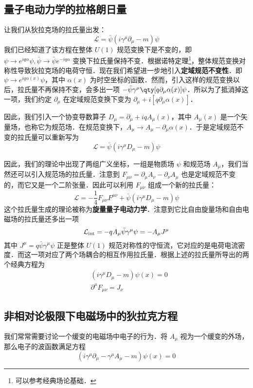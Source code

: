 

\subsection{量子电动力学的拉格朗日量}
让我们从狄拉克场的拉氏量出发：
\begin{equation}
\mathcal{L}=\bar\psi (i\gamma^\mu \partial_\mu - m)\psi 
\end{equation}
我们已经知道了该方程在整体 $U(1)$ 规范变换下是不变的，即 $\psi\rightarrow e^{iq\alpha}\psi,\bar\psi \rightarrow \bar\psi e^{-iq\alpha}$ 变换下拉氏量保持不变．根据诺特定理\footnote{可以参考经典场论基础．}，整体规范变换对称性导致狄拉克场的电荷守恒．现在我们希望进一步地引入\textbf{定域规范不变性}．即 $\psi\rightarrow e^{iq\alpha(x)}\psi $，其中 $\alpha(x)$ 为时空坐标的函数．然而，引入这样的规范变换以后，拉氏量不再保持不变，会多出一项 $-\bar\psi \gamma^\mu \qty[q\partial_\mu \alpha(x)]\psi$．所以为了抵消掉这一项，我们约定 $\partial_\mu$ 在定域规范变换下变为 $\partial_\mu+i[q\partial_\mu \alpha(x)]$．

因此，我们引入一个协变导数算子 $D_\mu = \partial_\mu +iqA_\mu(x)$，其中 $A_\mu(x)$ 是一个矢量场，也称它为规范场．在规范变换下，$A_\mu\rightarrow A_\mu - \partial_\mu \alpha(x)$．于是定域规范不变的拉氏量可以重新写为
\begin{equation}
\mathcal{L}=\bar\psi(i\gamma^\mu D_\mu-m)\psi 
\end{equation}

因此，我们的理论中出现了两组广义坐标，一组是物质场 $\psi$ 和规范场 $A_\mu$，我们当然还可以引入规范场的拉氏量．注意到 $F_{\mu\nu} = \partial_\mu A_\nu - \partial_\nu A_\mu$ 也是定域规范不变的，而它又是一个二阶张量．因此可以利用 $F_{\mu\nu}$ 组成一个新的拉氏量：
\begin{equation}
\mathcal{L}=-\frac{1}{4}F_{\mu\nu}F^{\mu\nu} + \bar\psi (i\gamma^\mu D_\mu - m)\psi
\end{equation}
这个拉氏量生成的理论被称为\textbf{旋量量子电动力学}．注意到它比自由旋量场和自由电磁场的拉氏量还多出一项
\begin{equation}
\mathcal{L}_{\rm int}=-q A_\mu \bar\psi \gamma^\mu \psi=-A_\mu J^\mu
\end{equation}
其中 $J^\mu = q\bar\psi \gamma^\mu \psi$ 正是整体 $U(1)$ 规范对称性的守恒流，它对应的是电荷电流密度．而这一项对应了两个场耦合的相互作用拉氏量．根据上述的拉氏量所导出的两个经典方程为
\begin{equation}
\begin{aligned}
&(i\gamma^\mu D_\mu - m)\psi(x)=0\\
&\partial^\mu F_{\mu\nu}=J_\nu
\end{aligned}
\end{equation}
\subsection{非相对论极限下电磁场中的狄拉克方程}
我们常常需要讨论一个缓变的电磁场中电子的行为．将 $A_\mu$ 视为一个缓变的外场，那么电子的波函数满足方程
\begin{equation}
(i\gamma^\mu \partial_\mu -\gamma^\mu A_\mu - m)\psi(x)=0
\end{equation}
